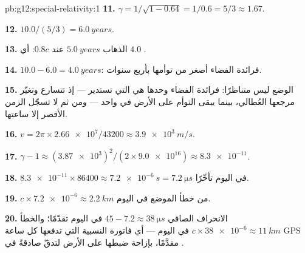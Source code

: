 \begin{solution}{pb:g12:special-relativity:1}
\textbf{11.} $\gamma = 1/\sqrt{1 - 0.64} = 1/0.6 = 5/3 \approx 1.67$.

\textbf{12.} $10.0/(5/3) = \qty{6.0}{years}$.

\textbf{13.} الذهاب $\qty{5.0}{years}$ عند $0.8c$: أي $4.0$ .

\textbf{14.} $10.0 - 6.0 = \qty{4.0}{years}$: فرائدة الفضاء أصغر من توأمها بأربع
سنوات.

\textbf{15.} الوضع ليس متناظرًا: فرائدة الفضاء وحدها هي التي
تستدير --- إذ تتسارع وتغيّر مرجعها العُطالي، بينما يبقى التوأم على
الأرض في  واحد --- ومن ثم لا تسجّل الزمن الأقصر إلا ساعتها.

\textbf{16.} $v = 2\pi \times \num{2.66e7}/\num{43200} \approx
\qty{3.9e3}{m/s}$.

\textbf{17.} $\gamma - 1 \approx (\num{3.87e3})^2/(2 \times
\num{9.0e16}) \approx \num{8.3e-11}$.

\textbf{18.} $\num{8.3e-11} \times \num{86400} \approx \qty{7.2e-6}{s}
= \qty{7.2}{\micro s}$ في اليوم تأخّرًا.

\textbf{19.} $c \times \num{7.2e-6} \approx \qty{2.2}{km}$ من خطأ
الموضع في اليوم.

\textbf{20.} الانحراف الصافي $45 - 7.2 \approx \qty{38}{\micro s}$ في اليوم
تقدّمًا؛ والخطأ $c \times \num{38e-6} \approx \qty{11}{km}$ في اليوم ---
أي فاتورة النسبية التي تدفعها كل ساعة GPS مقدَّمًا، بإزاحة ضبطها
على الأرض لتدقّ صادقةً في .
\end{solution}
